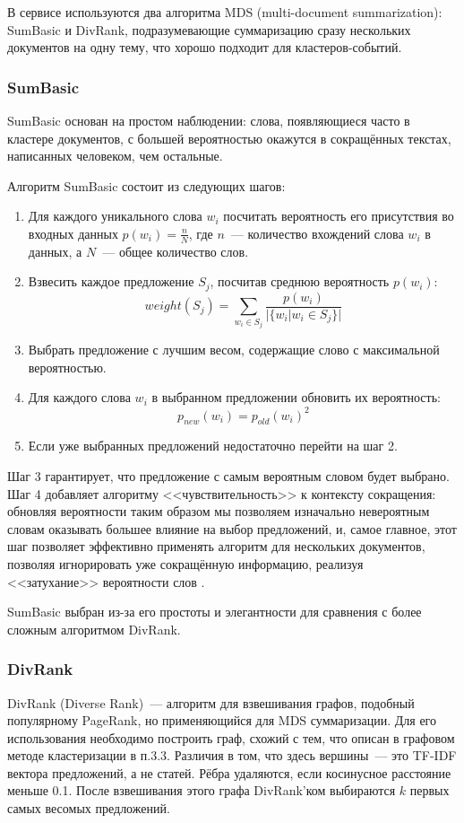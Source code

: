 \documentclass[a4paper, 14pt]{extarticle}
\begin{document}
В сервисе используются два алгоритма MDS (multi-document summarization): SumBasic и DivRank, подразумевающие суммаризацию сразу нескольких документов на одну тему, что хорошо подходит для кластеров-событий.
  
\subsubsection{SumBasic}
SumBasic основан на простом наблюдении: слова, появляющиеся часто в кластере документов, с большей вероятностью окажутся в сокращённых текстах, написанных человеком, чем остальные.

Алгоритм SumBasic состоит из следующих шагов:
\begin{enumerate}
	\item Для каждого уникального слова $w_i$ посчитать вероятность его присутствия во входных данных $p(w_i)=\frac{n}{N}$, где $n$~--- количество вхождений слова $w_i$ в данных, а $N$~--- общее количество слов.
	\item Взвесить каждое предложение $S_j$, посчитав среднюю вероятность $p(w_i)$:
	$$ weight(S_j) = \sum_{w_i\in S_j} \frac{p(w_i)}{|\{w_i|w_i\in S_j\}|}$$
	\item Выбрать предложение с лучшим весом, содержащие слово с максимальной вероятностью.
	\item Для каждого слова $w_i$ в выбранном предложении обновить их вероятность:
	$$p_{new}(w_i) = p_{old}(w_i)^2$$
	\item Если уже выбранных предложений недостаточно перейти на шаг 2. 
\end{enumerate} 

Шаг 3 гарантирует, что предложение с самым вероятным словом будет выбрано. Шаг 4 добавляет алгоритму <<чувствительность>> к контексту сокращения: обновляя вероятности таким образом мы позволяем изначально невероятным словам оказывать большее влияние на выбор предложений, и, самое главное, этот шаг позволяет эффективно применять алгоритм для нескольких документов, позволяя игнорировать уже сокращённую информацию, реализуя <<затухание>> вероятности слов \cite{Nenkova05theimpact, Vanderwende07beyondsumbasic}.

SumBasic выбран из-за его простоты и элегантности для сравнения с более сложным алгоритмом DivRank.
\subsubsection{DivRank}

DivRank (Diverse Rank)~--- алгоритм для взвешивания графов, подобный популярному PageRank, но применяющийся для MDS суммаризации. Для его использования необходимо построить граф, схожий с тем, что описан в графовом методе кластеризации в п.3.3. Различия в том, что здесь вершины~--- это TF-IDF вектора предложений, а не статей. Рёбра удаляются, если косинусное расстояние меньше 0.1. После взвешивания этого графа DivRank'ком выбираются $k$ первых самых весомых предложений.
\end{document}
